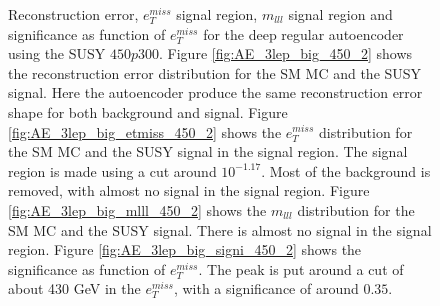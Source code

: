 \begin{figure}[H]
\begin{subfigure}{.40\textwidth}
    \end{subfigure}
    \hfill      
    \caption[3lep deep network | $450p300$ | AE | 2]{Reconstruction error, $e_T^{miss}$ signal region, $m_{lll}$ signal region and significance as function of 
    $e_T^{miss}$ for the deep regular autoencoder using the SUSY $450p300$. 
    Figure \ref{fig:AE_3lep_big_450_2} shows the reconstruction error 
    distribution for the SM MC and the SUSY signal. Here the autoencoder produce the same reconstruction error shape for both background and 
    signal. Figure \ref{fig:AE_3lep_big_etmiss_450_2} shows the $e_T^{miss}$ distribution for the SM MC and the SUSY signal in the signal region. 
    The signal region is made using a cut around $10^{-1.17}$. Most of the background is removed, with almost no signal in the signal region.
    Figure \ref{fig:AE_3lep_big_mlll_450_2} shows the $m_{lll}$ distribution for the SM MC and the SUSY signal. 
    There is almost no signal in the signal region. Figure \ref{fig:AE_3lep_big_signi_450_2} shows the significance as function of
    $e_T^{miss}$. The peak is put around a cut of about 430 GeV in the $e_T^{miss}$, with a significance of around $0.35$.}
    \label{fig:AE_3lep_big_rec_sig_signi_450_2}
\end{figure}

